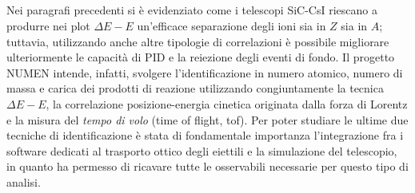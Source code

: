 \subsection*{}


Nei paragrafi precedenti si è evidenziato come i telescopi SiC-CsI riescano a produrre nei plot $\Delta E - E$ un'efficace separazione degli ioni sia in $Z$ sia in $A$; tuttavia, utilizzando anche altre tipologie di correlazioni è possibile migliorare ulteriormente le capacità di PID e la reiezione degli eventi di fondo. 
Il progetto NUMEN intende, infatti, svolgere l'identificazione in numero atomico, numero di massa e carica dei prodotti di reazione utilizzando congiuntamente la tecnica $\Delta E - E$, la correlazione posizione-energia cinetica originata dalla forza di Lorentz e la misura del \emph{tempo di volo} (time of flight, tof).
Per poter studiare le ultime due tecniche di identificazione è stata di fondamentale importanza l'integrazione fra i software dedicati al trasporto ottico degli eiettili e la simulazione del telescopio, in quanto ha permesso di ricavare tutte le osservabili necessarie per questo tipo di analisi. 

